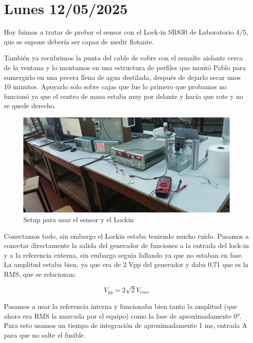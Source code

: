 \section{Lunes 12/05/2025}
Hoy fuimos a tratar de probar el sensor con el Lock-in SR830 de Laboratorio 4/5, que se supone debería ser capaz de medir flotante. 

También ya recubrimos la punta del cable de cobre con el esmalte aislante cerca de la ventana y lo montamos en una estructura de perfiles que montó Pablo para sumergirlo en una pecera llena de agua destilada, después de dejarlo secar unos 10 minutos. Apoyarlo solo sobre cajas que fue lo primero que probamos no funcionó ya que el centro de masa estaba muy por delante y hacía que rote y no se quede derecho. 

\begin{figure}[!ht]
	\centering
	\includegraphics[width=0.971\linewidth]{Figures/12_05_2025/20250512_113406.jpg} %
	\caption{Setup para usar el sensor y el Lockin}
	\label{fig:foto_12_05_2025}
\end{figure}

Conectamos todo, sin embargo el Lockin estaba teniendo mucho ruido. Pasamos a conectar directamente la salida del generador de funciones a la entrada del lock-in y a la referencia externa, sin embargo seguía fallando ya que no estaban en fase. La amplitud estaba bien, ya que era de 2 Vpp del generador y daba 0.71 que es la RMS, que se relacionan:

\begin{equation}
	V_{pp} = 2\sqrt{2} V_{rms} %
\end{equation} 

Pasamos a usar la referencia interna y funcionaba bien tanto la amplitud (que ahora era RMS la marcada por el equipo) como la fase de aproximadamente 0°. Para esto usamos un tiempo de integración de aproximadamente 1 ms, entrada A para que no salte el fusible. %

